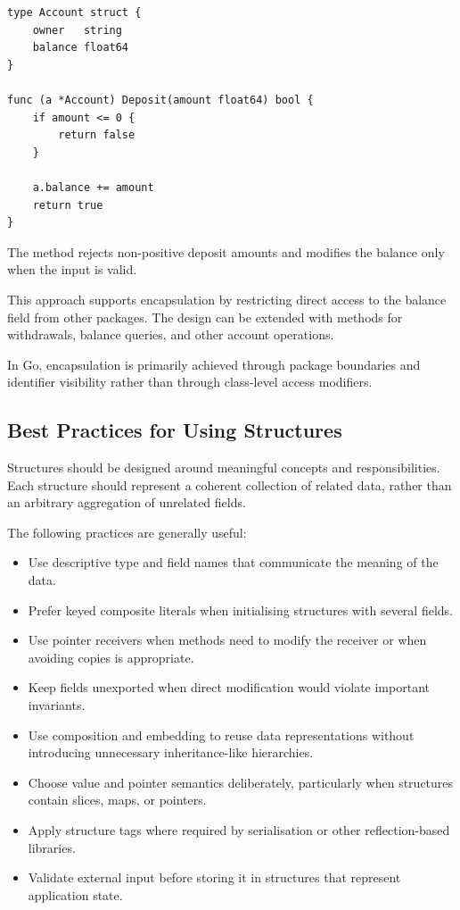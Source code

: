 \begin{lstlisting}
type Account struct {
    owner   string
    balance float64
}

func (a *Account) Deposit(amount float64) bool {
    if amount <= 0 {
        return false
    }

    a.balance += amount
    return true
}
\end{lstlisting}

The method rejects non-positive deposit amounts and modifies the balance only when the input is valid.

This approach supports encapsulation by restricting direct access to the balance field from other packages. The design can be extended with methods for withdrawals, balance queries, and other account operations.

In Go, encapsulation is primarily achieved through package boundaries and identifier visibility rather than through class-level access modifiers.

\subsection{Best Practices for Using Structures}

Structures should be designed around meaningful concepts and responsibilities. Each structure should represent a coherent collection of related data, rather than an arbitrary aggregation of unrelated fields.

The following practices are generally useful:

\begin{itemize}
    \item Use descriptive type and field names that communicate the meaning of the data.
    \item Prefer keyed composite literals when initialising structures with several fields.
    \item Use pointer receivers when methods need to modify the receiver or when avoiding copies is appropriate.
    \item Keep fields unexported when direct modification would violate important invariants.
    \item Use composition and embedding to reuse data representations without introducing unnecessary inheritance-like hierarchies.
    \item Choose value and pointer semantics deliberately, particularly when structures contain slices, maps, or pointers.
    \item Apply structure tags where required by serialisation or other reflection-based libraries.
    \item Validate external input before storing it in structures that represent application state.
\end{itemize}

